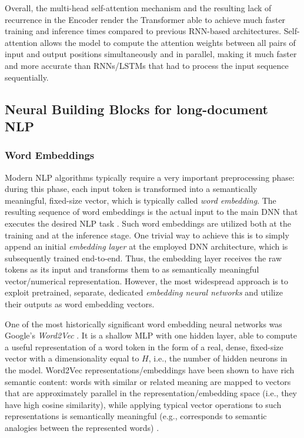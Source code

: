 \documentclass[preprint,review,12pt]{elsarticle}
\begin{document}
Overall, the multi-head self-attention mechanism and the resulting lack of recurrence in the Encoder render the Transformer able to achieve much faster training and inference times compared to previous RNN-based architectures. Self-attention allows the model to compute the attention weights between all pairs of input and output positions simultaneously and in parallel, making it much faster and more accurate than RNNs/LSTMs that had to process the input sequence sequentially.

\subsection{Neural Building Blocks for long-document NLP}
\subsubsection{Word Embeddings}
Modern NLP algorithms typically require a very important preprocessing phase: during this phase, each input token is transformed into a semantically meaningful, fixed-size vector, which is typically called \textit{word embedding}. The resulting sequence of word embeddings is the actual input to the main DNN that executes the desired NLP task \cite{mikolov}. Such word embeddings are utilized both at the training and at the inference stage. One trivial way to achieve this is to simply append an initial \textit{embedding layer} at the employed DNN architecture, which is subsequently trained end-to-end. Thus, the embedding layer receives the raw tokens as its input and transforms them to as semantically meaningful vector/numerical representation. However, the most widespread approach is to exploit pretrained, separate, dedicated \textit{embedding neural networks} and utilize their outputs as word embedding vectors.

One of the most historically significant word embedding neural networks was Google's \textit{Word2Vec} \cite{mikolov}. It is a shallow MLP with one hidden layer, able to compute a useful representation of a word token in the form of a real, dense, fixed-size vector with a dimensionality equal to $H$, i.e., the number of hidden neurons in the model. Word2Vec\cite{mikolov} representations/embeddings have been shown to have rich semantic content: words with similar or related meaning are mapped to vectors that are approximately parallel in the representation/embedding space (i.e., they have high cosine similarity), while applying typical vector operations to such representations is semantically meaningful (e.g., corresponds to semantic analogies between the represented words) \cite{jurafsky}.
\end{document}
